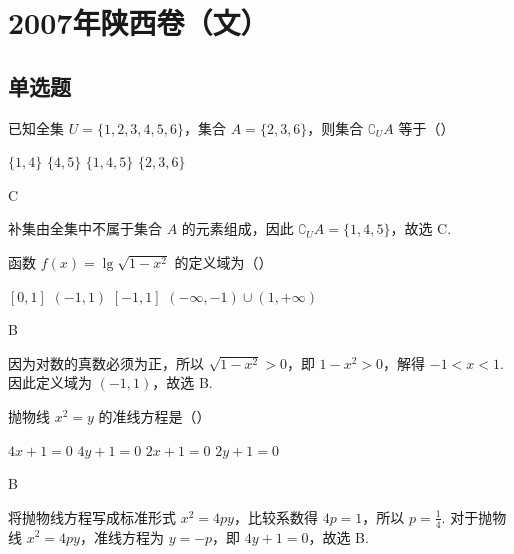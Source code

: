 \chapter{2007年陕西卷（文）}

\section{单选题}

\begin{problem}
已知全集 \(U = \{1, 2, 3, 4, 5, 6\}\)，集合 \(A = \{2, 3, 6\}\)，则集合 \(\complement_U A\) 等于（\quad）

\choices
    {\(\{1, 4\}\)}
    {\(\{4, 5\}\)}
    {\(\{1, 4, 5\}\)}
    {\(\{2, 3, 6\}\)}
\end{problem}

\begin{answer}
C
\end{answer}

\begin{solution}
补集由全集中不属于集合 \(A\) 的元素组成，因此 \(\complement_U A=\{1,4,5\}\)，故选 C.
\end{solution}

\begin{problem}
函数 \(f(x) = \lg \sqrt{1 - x^2}\) 的定义域为（\quad）

\choices
    {\([0, 1]\)}
    {\((-1, 1)\)}
    {\([-1, 1]\)}
    {\((-\infty, -1) \cup (1, +\infty)\)}
\end{problem}

\begin{answer}
B
\end{answer}

\begin{solution}
因为对数的真数必须为正，所以 \(\sqrt{1-x^2}>0\)，即 \(1-x^2>0\)，解得 \(-1<x<1\). 因此定义域为 \((-1,1)\)，故选 B.
\end{solution}

\begin{problem}
抛物线 \(x^2 = y\) 的准线方程是（\quad）

\choices
    {\(4x + 1 = 0\)}
    {\(4y + 1 = 0\)}
    {\(2x + 1 = 0\)}
    {\(2y + 1 = 0\)}
\end{problem}

\begin{answer}
B
\end{answer}

\begin{solution}
将抛物线方程写成标准形式 \(x^2=4py\)，比较系数得 \(4p=1\)，所以 \(p=\frac14\). 对于抛物线 \(x^2=4py\)，准线方程为 \(y=-p\)，即 \(4y+1=0\)，故选 B.
\end{solution}

